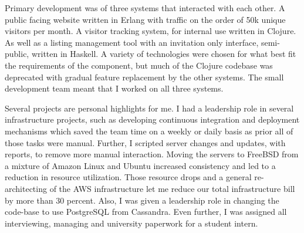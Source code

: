 \documentclass[margintitle,line]{res}
\begin{document}
\begin{resume}
\begin{position}
  Primary development was of three systems that interacted with each other.
  A public facing website  written in Erlang with traffic on the order of 50k
  unique visitors per month. A visitor tracking system, for internal use written
  in Clojure. As well as a listing management tool with an invitation only
  interface, semi-public, written in Haskell. A variety of technologies were
  chosen for what best fit the requirements of the component, but much of the
  Clojure codebase was deprecated with gradual feature replacement by the other
  systems. The small development team meant that I worked on all three systems.



  Several projects are personal highlights for me. I had a leadership role
  in several infrastructure projects, such as developing continuous integration
  and deployment mechanisms which saved the team time on a weekly or daily basis
  as prior all of those tasks were manual. Further, I scripted server changes
  and updates, with reports, to remove more manual interaction. Moving the
  servers to FreeBSD from a mixture of Amazon Linux and Ubuntu increased
  consistency and led to a reduction in resource utilization. Those resource
  drops and a general re-architecting of the AWS infrastructure let me
  reduce our total infrastructure bill by more than 30 percent. Also, I was
  given a leadership role in changing the code-base to use PostgreSQL from Cassandra.
  Even further, I was assigned all interviewing, managing and university paperwork
  for a student intern.



\end{position}
\end{resume}
\end{document}
